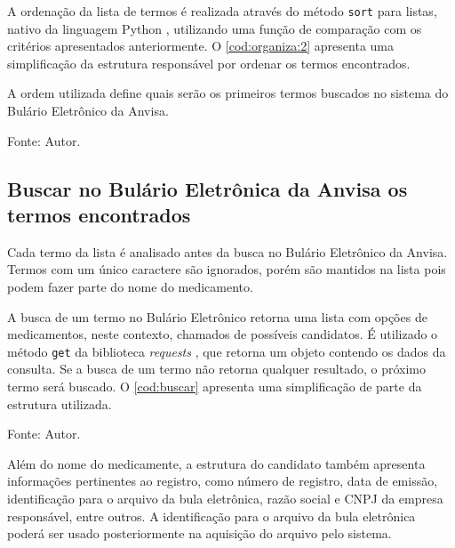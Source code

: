 A ordenação da lista de termos é realizada através do método \lstinline|sort| para listas, nativo da linguagem Python \cite{pythonSorting}, utilizando uma função de comparação com os critérios apresentados anteriormente.
O \autoref{cod:organiza:2} apresenta uma simplificação da estrutura responsável por ordenar os termos encontrados.

A ordem utilizada define quais serão os primeiros termos buscados no sistema do Bulário Eletrônico da \ac{Anvisa}.

\begin{lstfloat}[htbp]
    \centering
    
    \caption*{Fonte: Autor.}
\end{lstfloat}

\subsection{Buscar no Bulário Eletrônica da \acs{Anvisa} os termos encontrados}\label{ssec:buscar}


Cada termo da lista é analisado antes da busca no Bulário Eletrônico da \ac{Anvisa}.
Termos com um único caractere são ignorados, porém são mantidos na lista pois podem fazer parte do nome do medicamento.

A busca de um termo no Bulário Eletrônico retorna uma lista com opções de medicamentos, neste contexto, chamados de possíveis candidatos.
É utilizado o método \lstinline|get| da biblioteca \textit{requests} \cite{reitz2024request}, que retorna um objeto contendo os dados da consulta.
Se a busca de um termo não retorna qualquer resultado, o próximo termo será buscado.
O \autoref{cod:buscar} apresenta uma simplificação de parte da estrutura utilizada.

\begin{lstfloat}[htbp]
    \centering
    
    \caption*{Fonte: Autor.}
\end{lstfloat}

Além do nome do medicamente, a estrutura do candidato também apresenta informações pertinentes ao registro, como número de registro, data de emissão, identificação para o arquivo da bula eletrônica, razão social e \acs{CNPJ} da empresa responsável, entre outros.
A identificação para o arquivo da bula eletrônica poderá ser usado posteriormente na aquisição do arquivo pelo sistema.

